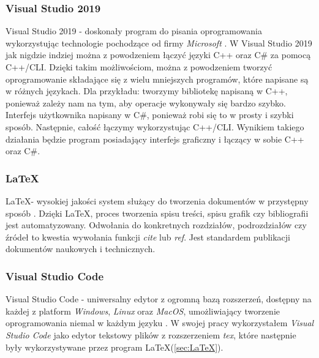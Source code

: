 \documentclass{article}
\begin{document}
        \subsubsection{Visual Studio 2019}
        {
            \label{sec:VisualStudio2019}
            \Large
            \justifying
            \quad
            Visual Studio 2019 - doskonały program do pisania oprogramowania wykorzystując technologie pochodzące od firmy \emph{Microsoft} \cite{VS2019}.
            W Visual Studio 2019 jak nigdzie indziej można z powodzeniem łączyć języki C++ oraz C\# za pomocą C++/CLI.
            Dzięki takim możliwościom, można z powodzeniem tworzyć oprogramowanie składające się z wielu mniejszych programów, które napisane są w różnych językach.
            Dla przykładu: tworzymy bibliotekę napisaną w C++, ponieważ zależy nam na tym, aby operacje wykonywały się bardzo szybko.
            Interfejs użytkownika napisany w C\#, ponieważ robi się to w prosty i szybki sposób.
            Następnie, całość łączymy wykorzystując C++/CLI.
            Wynikiem takiego działania będzie program posiadający interfejs graficzny i łączący w sobie C++ oraz C\#.
        }
        \subsubsection{\LaTeX}
        {
            \label{sec:LaTeX}
            \Large
            \justifying
            \LaTeX - wysokiej jakości system służący do tworzenia dokumentów w przystępny sposób \cite{LaTeX}.
            Dzięki \LaTeX, proces tworzenia spisu treści, spisu grafik czy bibliografii jest automatyzowany.
            Odwołania do konkretnych rozdziałów, podrozdziałów czy źródeł to kwestia wywołania funkcji \emph{cite} lub \emph{ref}.
            Jest standardem publikacji dokumentów naukowych i technicznych.
        }
        \subsubsection{Visual Studio Code}
        {
            \label{sec:VisualStudioCode}
            \Large
            \justifying
            \quad
            Visual Studio Code - uniwersalny edytor z ogromną bazą rozszerzeń, dostępny na każdej z platform \emph{Windows}, \emph{Linux} oraz \emph{MacOS}, umożliwiający tworzenie oprogramowania niemal w każdym języku \cite{VSCode}.
            W swojej pracy wykorzystałem \emph{Visual Studio Code} jako edytor tekstowy plików z rozszerzeniem \emph{tex}, które następnie były wykorzystywane przez program \LaTeX (\ref{sec:LaTeX}).
        }
\end{document}
